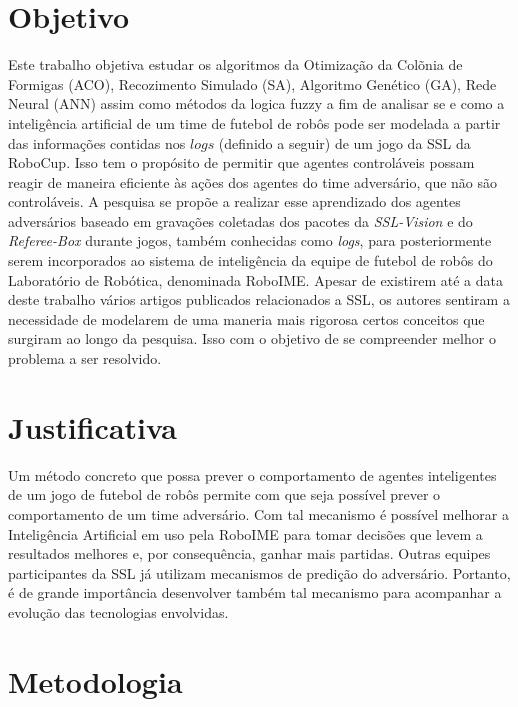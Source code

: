 \section{Objetivo}

Este trabalho objetiva estudar os algoritmos da Otimização da Colõnia de Formigas (ACO),
Recozimento Simulado (SA), Algoritmo Genético (GA), Rede Neural (ANN) assim como métodos
da logica fuzzy a fim de analisar se e como a inteligência
artificial de um time de futebol de robôs pode ser modelada a partir das informações contidas nos $logs$ (definido a seguir)
de um jogo da SSL da RoboCup. Isso tem o propósito de permitir que agentes controláveis
possam reagir de maneira eficiente às ações dos agentes do time adversário, que
não são controláveis. A pesquisa se propõe a realizar esse aprendizado dos
agentes adversários baseado em gravações coletadas dos pacotes da
\textit{SSL-Vision} e do \textit{Referee-Box} durante jogos, também conhecidas
como \textit{logs}, para posteriormente serem incorporados ao sistema de inteligência da
equipe de futebol de robôs do Laboratório de Robótica, denominada RoboIME\@. Apesar
de existirem até a data deste trabalho vários artigos publicados relacionados a
SSL, os autores sentiram a necessidade de modelarem de uma maneria mais rigorosa
certos conceitos que surgiram ao longo da pesquisa. Isso com o objetivo de se
compreender melhor o problema a ser resolvido.

\section{Justificativa}%

Um método concreto que possa prever o comportamento de agentes inteligentes de um jogo de
futebol de robôs permite com que seja possível prever o comportamento de um time adversário.
Com tal mecanismo é possível melhorar a Inteligência Artificial em uso pela RoboIME
para tomar decisões que levem a resultados melhores e, por consequência, ganhar mais partidas.
Outras equipes participantes da SSL já utilizam mecanismos de predição do adversário.
Portanto, é de grande importância desenvolver também tal mecanismo para acompanhar a evolução
das tecnologias envolvidas.

\section{Metodologia}

